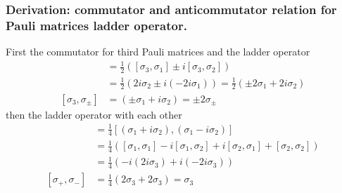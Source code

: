 \documentclass[../../../main.tex]{subfiles}
\begin{document}
\subsubsection{Derivation: commutator and anticommutator relation for Pauli matrices ladder operator.}
First the commutator for third Pauli matrices and the ladder operator
\begin{align*}
    [\sigma_3, \sigma_\pm]
     & =  \frac{1}{2} \left( [\sigma_3, \sigma_1] \pm i[\sigma_3, \sigma_2] \right)                                      \\
     & =  \frac{1}{2} \left( 2i\sigma_2 \pm i(-2i\sigma_1) \right) = \frac{1}{2} \left( \pm 2\sigma_1 + 2i\sigma_2 \right) \\
    [\sigma_3, \sigma_\pm]
     & = (\pm \sigma_1 + i \sigma_2) = \pm 2 \sigma_{\pm}
\end{align*}
then the ladder operator with each other
\begin{align*}
    [\sigma_+,\sigma_-]
     & =  \frac{1}{4} [(\sigma_1 + i\sigma_2), (\sigma_1 - i\sigma_2)]                                                       \\
     & =  \frac{1}{4} \left( [\sigma_1,\sigma_1] - i[\sigma_1,\sigma_2] + i[\sigma_2,\sigma_1] + [\sigma_2,\sigma_2] \right) \\
     & =  \frac{1}{4}\left( -i(2i\sigma_3) + i(-2i\sigma_3) \right)                                                          \\
    [\sigma_+, \sigma_-]
     & = \frac{1}{4}(2\sigma_3 + 2\sigma_3) = \sigma_3
\end{align*}
\end{document}
